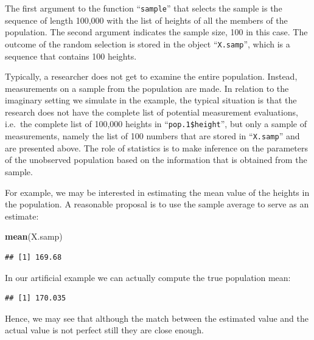 \documentclass[]{krantz}
\makeatletter
\newenvironment{Shaded}{\begin{snugshade}}{\end{snugshade}}
\newcommand{\KeywordTok}[1]{\textcolor[rgb]{0.13,0.29,0.53}{\textbf{#1}}}
\newcommand{\DecValTok}[1]{\textcolor[rgb]{0.00,0.00,0.81}{#1}}
\newcommand{\OperatorTok}[1]{\textcolor[rgb]{0.81,0.36,0.00}{\textbf{#1}}}
\newcommand{\NormalTok}[1]{#1}
\newenvironment{kframe}{%
\medskip{}
\setlength{\fboxsep}{.8em}
 \def\at@end@of@kframe{}%
 \ifinner\ifhmode%
  \def\at@end@of@kframe{\end{minipage}}%
  \begin{minipage}{\columnwidth}%
 \fi\fi%
 \def\FrameCommand##1{\hskip\@totalleftmargin \hskip-\fboxsep
 \colorbox{shadecolor}{##1}\hskip-\fboxsep
     \hskip-\linewidth \hskip-\@totalleftmargin \hskip\columnwidth}%
 \MakeFramed {\advance\hsize-\width
   \@totalleftmargin\z@ \linewidth\hsize
   \@setminipage}}%
 {\par\unskip\endMakeFramed%
 \at@end@of@kframe}
\renewenvironment{Shaded}{\begin{kframe}}{\end{kframe}}
\theoremstyle{definition}
\theoremstyle{definition}
\theoremstyle{definition}
\theoremstyle{remark}
\makeatother
\begin{document}
The first argument to the function ``\texttt{sample}'' that selects the
sample is the sequence of length 100,000 with the list of heights of all
the members of the population. The second argument indicates the sample
size, 100 in this case. The outcome of the random selection is stored in
the object ``\texttt{X.samp}'', which is a sequence that contains 100
heights.

Typically, a researcher does not get to examine the entire population.
Instead, measurements on a sample from the population are made. In
relation to the imaginary setting we simulate in the example, the
typical situation is that the research does not have the complete list
of potential measurement evaluations, i.e.~the complete list of 100,000
heights in ``\texttt{pop.1\$height}'', but only a sample of
measurements, namely the list of 100 numbers that are stored in
``\texttt{X.samp}'' and are presented above. The role of statistics is
to make inference on the parameters of the unobserved population based
on the information that is obtained from the sample.

For example, we may be interested in estimating the mean value of the
heights in the population. A reasonable proposal is to use the sample
average to serve as an estimate:

\begin{Shaded}
\begin{Highlighting}[]
\KeywordTok{mean}\NormalTok{(X.samp)}
\end{Highlighting}
\end{Shaded}

\begin{verbatim}
## [1] 169.68
\end{verbatim}

In our artificial example we can actually compute the true population
mean:

\begin{Shaded}
\end{Shaded}

\begin{verbatim}
## [1] 170.035
\end{verbatim}

Hence, we may see that although the match between the estimated value
and the actual value is not perfect still they are close enough.
\end{document}
